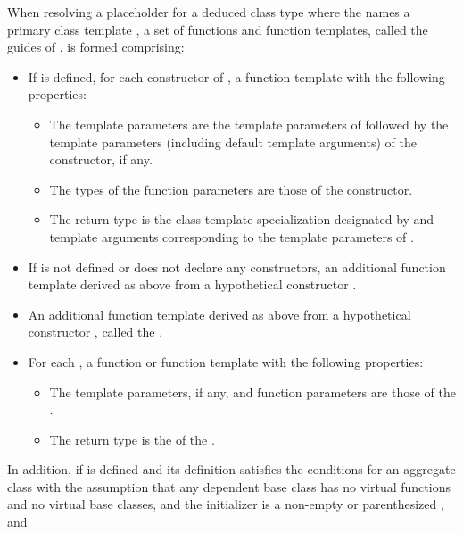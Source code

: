 \pnum
When resolving a placeholder for a deduced class type
where the  names a primary class template ,
a set of functions and function templates, called the guides of ,
is formed comprising:
\begin{itemize}
\item
If  is defined,
for each constructor of ,
a function template with the following properties:
\begin{itemize}
\item
The template parameters are the template parameters of 
followed
by the template parameters (including default template arguments) of the constructor,
if any.
\item
The types of the function parameters are those of the constructor.
\item
The return type is the class template specialization
designated by 
and template arguments
corresponding to the template parameters of .
\end{itemize}

\item
If 
is not defined or does not declare any constructors,
an additional function template derived as above
from a hypothetical constructor .

\item
An additional function template derived as above
from a hypothetical constructor ,
called the .

\item
For each ,
a function or function template
with the following properties:

\begin{itemize}
\item
The template parameters, if any,
and function parameters
are those of the .
\item
The return type
is the 
of the .
\end{itemize}
\end{itemize}
In addition, if  is defined
and its definition satisfies the conditions for
an aggregate class
with the assumption that any dependent base class has
no virtual functions and no virtual base classes, and
the initializer is a non-empty  or
parenthesized , and
